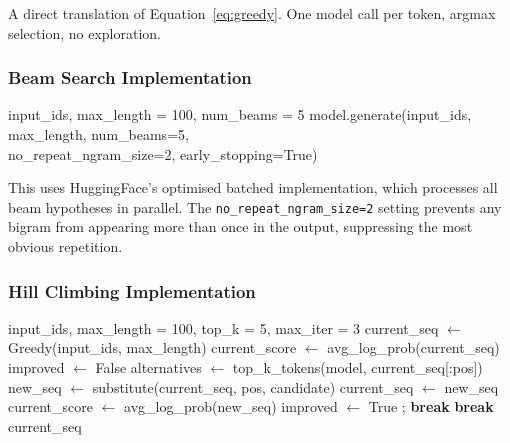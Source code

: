 \documentclass[12pt]{article}
\begin{document}
	A direct translation of Equation~\eqref{eq:greedy}. One model call per token, argmax selection, no exploration.
	
	\subsubsection{Beam Search Implementation}
	
	\begin{algorithm}[H]
		\caption{Beam Search (via HuggingFace \texttt{model.generate()})}
		\label{alg:beam}
		\begin{algorithmic}[1]
			\Require input\_ids, max\_length = 100, num\_beams = 5
			\State \Return model.generate(input\_ids, max\_length, num\_beams=5,\\
			\hspace{4cm} no\_repeat\_ngram\_size=2, early\_stopping=True)
		\end{algorithmic}
	\end{algorithm}
	
	This uses HuggingFace's optimised batched implementation, which processes all beam hypotheses in parallel. The \texttt{no\_repeat\_ngram\_size=2} setting prevents any bigram from appearing more than once in the output, suppressing the most obvious repetition.
	
	\subsubsection{Hill Climbing Implementation}
	
	\begin{algorithm}[H]
		\caption{Hill Climbing Search}
		\label{alg:hillclimb}
		\begin{algorithmic}[1]
			\Require input\_ids, max\_length = 100, top\_k = 5, max\_iter = 3
			\State current\_seq $\leftarrow$ Greedy(input\_ids, max\_length) 
			\State current\_score $\leftarrow$ avg\_log\_prob(current\_seq)
			\State improved $\leftarrow$ False
			\State alternatives $\leftarrow$ top\_k\_tokens(model, current\_seq[:pos])
			\State new\_seq $\leftarrow$ substitute(current\_seq, pos, candidate)
			\State current\_seq $\leftarrow$ new\_seq
			\State current\_score $\leftarrow$ avg\_log\_prob(new\_seq)
			\State improved $\leftarrow$ True ; \textbf{break}
			\EndIf
			\EndFor
			\EndFor
			 \textbf{break} \EndIf {}
			\EndFor
			\Return current\_seq
		\end{algorithmic}
	\end{algorithm}
	
\end{document}
